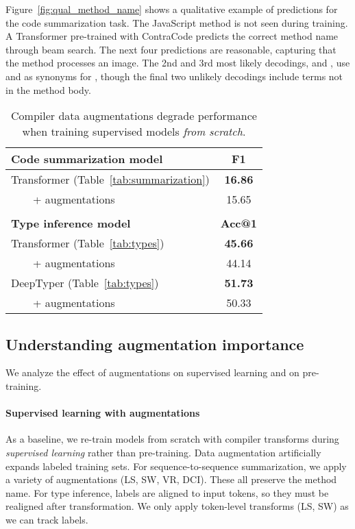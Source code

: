 \documentclass[11pt]{article}
\newcommand{\ours}[0]{ContraCode}
\begin{document}
Figure~\ref{fig:qual_method_name} shows a qualitative example of predictions for the code summarization task. The JavaScript method is not seen during training. A Transformer pre-trained with \ours{} predicts the correct method name through beam search. The next four predictions are reasonable, capturing that the method processes an image. The 2nd and 3rd most likely decodings,  and , use  and  as synonyms for , though the final two unlikely decodings include terms not in the method body.

\begin{table}
\centering
\centering
\begin{tabular}{lc} \hline
    \cellcolor{white}\textbf{Code summarization model} & \textbf{F1} \\ \hline
    Transformer (Table~\ref{tab:summarization})              & \textbf{16.86}\\
    ~~~~+ augmentations                                 & 15.65\\ \hline \vspace{-2mm} \\ \hline
    \textbf{Type inference model} & \textbf{Acc@1} \\ \hline
    Transformer (Table~\ref{tab:types})     & \textbf{45.66}\\
    ~~~~+ augmentations                       & 44.14\\ \hline
    DeepTyper (Table~\ref{tab:types})       & \textbf{51.73}\\
    ~~~~+ augmentations              & 50.33\\
     \hline
\end{tabular}
\caption{Compiler data augmentations degrade performance when training supervised models \textit{from scratch}.}
\label{tab:supervised_aug}
\end{table} 
\subsection{Understanding augmentation importance}
\label{sec:experiments_augmentation}
We analyze the effect of augmentations on supervised learning and on pre-training.

\paragraph{Supervised learning with augmentations} As a baseline, we re-train models from scratch with compiler transforms during \textit{supervised learning} rather than pre-training. Data augmentation artificially expands labeled training sets. For sequence-to-sequence summarization, we apply a variety of augmentations (LS, SW, VR, DCI). These all preserve the method name. For type inference, labels are aligned to input tokens, so they must be realigned after transformation. We only apply token-level transforms (LS, SW) as we can track labels.
\end{document}
